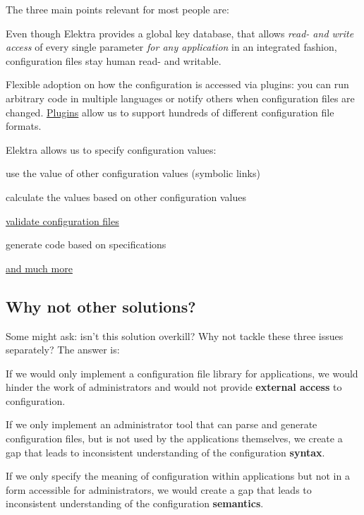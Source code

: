 The three main points relevant for most people are\+:


\begin{DoxyEnumerate}
\item Even though Elektra provides a global key database, that allows {\itshape read-\/ and write access} of every single parameter {\itshape for any application} in an integrated fashion, configuration files stay human read-\/ and writable.
\item Flexible adoption on how the configuration is accessed via plugins\+: you can run arbitrary code in multiple languages or notify others when configuration files are changed. \hyperlink{md_src_plugins_README_src_plugins_README_md}{Plugins} allow us to support hundreds of different configuration file formats.
\item Elektra allows us to specify configuration values\+:
\begin{DoxyItemize}
\item use the value of other configuration values (symbolic links)
\item calculate the values based on other configuration values
\item \hyperlink{doc_tutorials_validation_md}{validate configuration files}
\item generate code based on specifications
\item \hyperlink{md_src_plugins_README_src_plugins_README_md}{and much more}
\end{DoxyItemize}
\end{DoxyEnumerate}

\subsection*{Why not other solutions?}

Some might ask\+: isn't this solution overkill? Why not tackle these three issues separately? The answer is\+:


\begin{DoxyEnumerate}
\item If we would only implement a configuration file library for applications, we would hinder the work of administrators and would not provide {\bfseries external access} to configuration.
\item If we only implement an administrator tool that can parse and generate configuration files, but is not used by the applications themselves, we create a gap that leads to inconsistent understanding of the configuration {\bfseries syntax}.
\item If we only specify the meaning of configuration within applications but not in a form accessible for administrators, we would create a gap that leads to inconsistent understanding of the configuration {\bfseries semantics}.
\end{DoxyEnumerate}

